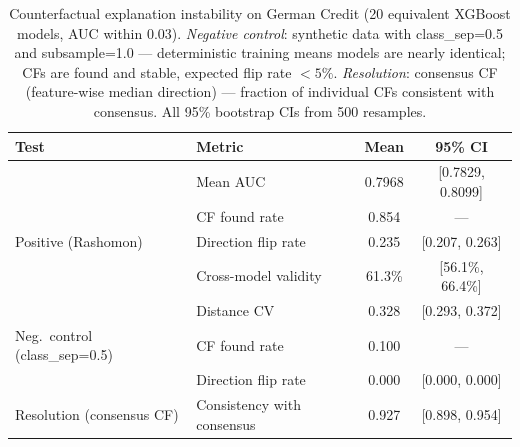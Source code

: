 \begin{table}[t]
\centering
\caption{Counterfactual explanation instability on German Credit (20 equivalent XGBoost models, AUC within 0.03).
  \emph{Negative control}: synthetic data with class\_sep=0.5 and subsample=1.0 --- deterministic training means models are nearly identical; CFs are found and stable, expected flip rate $<5\%$.
  \emph{Resolution}: consensus CF (feature-wise median direction) --- fraction of individual CFs consistent with consensus.
  All 95\% bootstrap CIs from 500 resamples.}
\label{tab:counterfactual-instability}
\setlength{\tabcolsep}{6pt}
\begin{tabular}{llcc}
\toprule
Test & Metric & Mean & 95\% CI \\
\midrule
\multirow{5}{*}{Positive (Rashomon)} & Mean AUC & 0.7968 & [0.7829, 0.8099] \\
& CF found rate & 0.854 & --- \\
& Direction flip rate & 0.235 & [0.207, 0.263] \\
& Cross-model validity & 61.3\% & [56.1\%, 66.4\%] \\
& Distance CV & 0.328 & [0.293, 0.372] \\
\midrule
Neg.\ control (class\_sep=0.5) & CF found rate & 0.100 & --- \\
& Direction flip rate & 0.000 & [0.000, 0.000] \\
\midrule
Resolution (consensus CF) & Consistency with consensus & 0.927 & [0.898, 0.954] \\
\bottomrule
\end{tabular}
\end{table}
